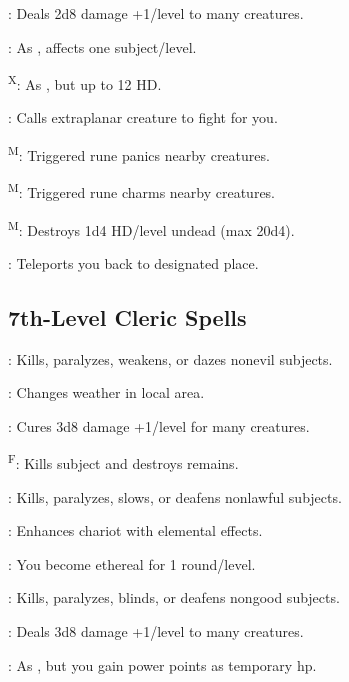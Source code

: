 : Deals 2d8 damage +1/level to many creatures.

: As , affects one subject/level.

\textsuperscript{X}: As , but up to 12 HD.

: Calls extraplanar creature to fight for you.

\textsuperscript{M}: Triggered rune panics nearby creatures.

\textsuperscript{M}: Triggered rune charms nearby creatures.

\textsuperscript{M}: Destroys 1d4 HD/level undead (max 20d4).


: Teleports you back to designated place.



\subsection{7th-Level Cleric Spells}

: Kills, paralyzes, weakens, or dazes nonevil subjects.

: Changes weather in local area.

: Cures 3d8 damage +1/level for many creatures.

\textsuperscript{F}: Kills subject and destroys remains.

: Kills, paralyzes, slows, or deafens nonlawful subjects.

: Enhances chariot with elemental effects. %

: You become ethereal for 1 round/level.

: Kills, paralyzes, blinds, or deafens nongood subjects.

: Deals 3d8 damage +1/level to many creatures.

: As , but you gain power points as temporary hp.

